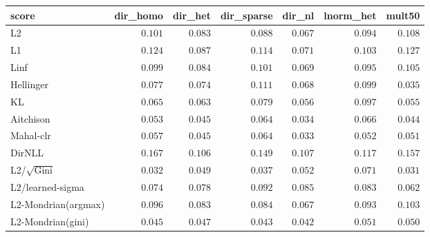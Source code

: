 \begin{tabular}{lrrrrrr}
\toprule
score & dir\_homo & dir\_het & dir\_sparse & dir\_nl & lnorm\_het & mult50 \\
\midrule
L2 & $0.101$ & $0.083$ & $0.088$ & $0.067$ & $0.094$ & $0.108$ \\
L1 & $0.124$ & $0.087$ & $0.114$ & $0.071$ & $0.103$ & $0.127$ \\
Linf & $0.099$ & $0.084$ & $0.101$ & $0.069$ & $0.095$ & $0.105$ \\
Hellinger & $0.077$ & $0.074$ & $0.111$ & $0.068$ & $0.099$ & $0.035$ \\
KL & $0.065$ & $0.063$ & $0.079$ & $0.056$ & $0.097$ & $0.055$ \\
Aitchison & $0.053$ & $0.045$ & $0.064$ & $0.034$ & $0.066$ & $0.044$ \\
Mahal-clr & $0.057$ & $\mathbf{0.045}$ & $0.064$ & $\mathbf{0.033}$ & $0.052$ & $0.051$ \\
DirNLL & $0.167$ & $0.106$ & $0.149$ & $0.107$ & $0.117$ & $0.157$ \\
L2/$\sqrt{\mathrm{Gini}}$ & $\mathbf{0.032}$ & $0.049$ & $\mathbf{0.037}$ & $0.052$ & $0.071$ & $\mathbf{0.031}$ \\
L2/learned-sigma & $0.074$ & $0.078$ & $0.092$ & $0.085$ & $0.083$ & $0.062$ \\
L2-Mondrian(argmax) & $0.096$ & $0.083$ & $0.084$ & $0.067$ & $0.093$ & $0.103$ \\
L2-Mondrian(gini) & $0.045$ & $0.047$ & $0.043$ & $0.042$ & $\mathbf{0.051}$ & $0.050$ \\
\bottomrule
\end{tabular}